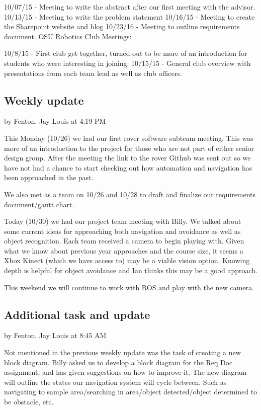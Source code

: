 \documentclass[10pt, oneside,onecolumn]{IEEEtran}
\begin{document}
\begin{titlepage}
10/07/15 - Meeting to write the abstract after our first meeting with the advisor.
10/13/15 - Meeting to write the problem statement
10/16/15 - Meeting to create the Sharepoint website and blog
10/23/16 - Meeting to outline requirements document.
OSU Robotics Club Meetings:

10/8/15 - First club get together, turned out to be more of an introduction for students who were interesting in joining.
10/15/15 - General club overview with presentations from each team lead as well as club officers. 

\subsection{Weekly update}
by Fenton, Jay Louis at 4:19 PM

This Monday (10/26) we had our first rover software subteam meeting. This was more of an introduction to the project for those who are not part of either senior design group. After the meeting the link to the rover Github was sent out so we have not had a chance to start checking out how automation and navigation has been approached in the past.

We also met as a team on 10/26 and 10/28 to draft and finalize our requirements document/gantt chart. 

Today (10/30) we had our project team meeting with Billy. We talked about some current ideas for approaching both navigation and avoidance as well as object recognition. Each team received a camera to begin playing with. Given what we know about previous year approaches and the course size, it seems a Xbox Kinect (which we have access to) may be a viable vision option. Knowing depth is helpful for object avoidance and Ian thinks this may be a good approach. 

This weekend we will continue to work with ROS and play with the new camera. 

\subsection{Additional task and update}
by Fenton, Jay Louis at 8:45 AM

Not mentioned in the previous weekly update was the task of creating a new block diagram. Billy asked us to develop a block diagram for the Req Doc assignment, and has given suggestions on how to improve it. The new diagram will outline the states our navigation system will cycle between. Such as navigating to sample area/searching in area/object detected/object determined to be obstacle, etc.


\end{titlepage}
\end{document}
